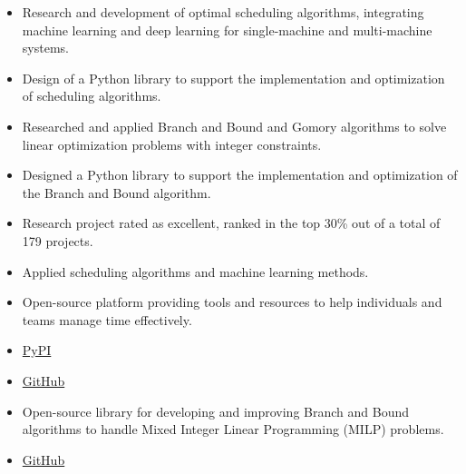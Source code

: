 \documentclass[10pt,a4paper,ragged2e,withhyper]{altacv}
\begin{document}
\begin{paracol}{2}


\begin{itemize}
\item Research and development of optimal scheduling algorithms, integrating machine learning and deep learning for single-machine and multi-machine systems.
\item Design of a Python library to support the implementation and optimization of scheduling algorithms.
\end{itemize}


\divider


\begin{itemize}
\item Researched and applied Branch and Bound and Gomory algorithms to solve linear optimization problems with integer constraints.
\item Designed a Python library to support the implementation and optimization of the Branch and Bound algorithm.
\item Research project rated as excellent, ranked in the top 30\% out of a total of 179 projects.
\end{itemize}



\begin{itemize}
\item Applied scheduling algorithms and machine learning methods.
\item Open-source platform providing tools and resources to help individuals and teams manage time effectively.
\item \href{https://pypi.org/project/TiLearn/}{PyPI} \faPython
\item \href{https://github.com/Bancie/TiLearn}{GitHub} \faGithubSquare
\end{itemize}

\divider

\begin{itemize}
\item Open-source library for developing and improving Branch and Bound algorithms to handle Mixed Integer Linear Programming (MILP) problems.
\item \href{https://github.com/Bancie/Optimization-Oracle}{GitHub} \faGithubSquare
\end{itemize}


\end{paracol}
\end{document}
